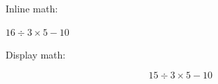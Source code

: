 \documentclass{article}
\begin{document}
Inline math:

$16\div3\times5-10$


Display math:

\[
15 \div 3 \times 5 - 10
\]
\end{document}
